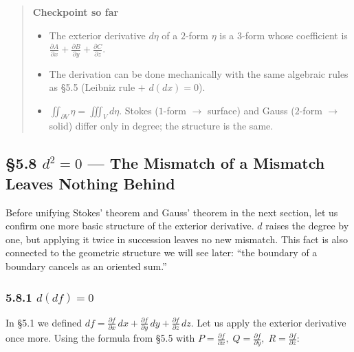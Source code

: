 \documentclass[a4paper,12pt,openany]{book}
\begin{document}
\begin{quote}
\textbf{Checkpoint so far}

\begin{itemize}
\item
  The exterior derivative \(d\eta\) of a \(2\)-form \(\eta\) is a
  \(3\)-form whose coefficient is
  \(\frac{\partial A}{\partial x} + \frac{\partial B}{\partial y} + \frac{\partial C}{\partial z}\).
\item
  The derivation can be done mechanically with the same algebraic rules
  as §5.5 (Leibniz rule \(+\) \(d(dx)=0\)).
\item
  \(\iint_{\partial V} \eta = \iiint_V d\eta\). Stokes (\(1\)-form
  \(\to\) surface) and Gauss (\(2\)-form \(\to\) solid) differ only in
  degree; the structure is the same.
\end{itemize}
\end{quote}

\par\vspace{0.35em}\par

\hypertarget{d2-0-the-mismatch-of-a-mismatch-leaves-nothing-behind}{%
\subsection{\texorpdfstring{§5.8 \(d^2 = 0\) — The Mismatch of a
Mismatch Leaves Nothing
Behind}{§5.8 d\^{}2 = 0 — The Mismatch of a Mismatch Leaves Nothing Behind}}\label{d2-0-the-mismatch-of-a-mismatch-leaves-nothing-behind}}

Before unifying Stokes' theorem and Gauss' theorem in the next section,
let us confirm one more basic structure of the exterior derivative.
\(d\) raises the degree by one, but applying it twice in succession
leaves no new mismatch. This fact is also connected to the geometric
structure we will see later: ``the boundary of a boundary cancels as an
oriented sum.''

\hypertarget{ddf-0}{%
\subsubsection{\texorpdfstring{5.8.1
\(d(df) = 0\)}{5.8.1 d(df) = 0}}\label{ddf-0}}

In §5.1 we defined
\(df = \frac{\partial f}{\partial x}\,dx + \frac{\partial f}{\partial y}\,dy + \frac{\partial f}{\partial z}\,dz\).
Let us apply the exterior derivative once more. Using the formula from
§5.5 with
\(P = \frac{\partial f}{\partial x},\; Q = \frac{\partial f}{\partial y},\; R = \frac{\partial f}{\partial z}\):
\end{document}
